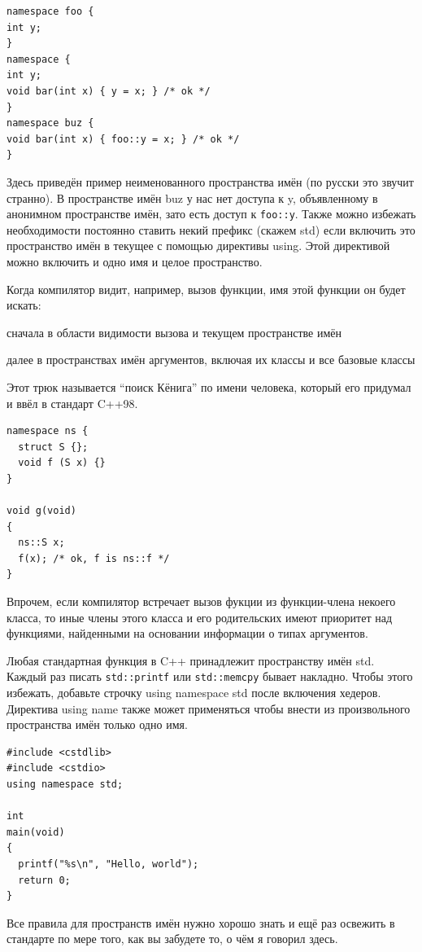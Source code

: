 \documentclass[a4paper,12pt,oneside]{article}
\begin{document}
\begin{lstlisting}
namespace foo {
int y;
}
namespace {
int y;
void bar(int x) { y = x; } /* ok */
}
namespace buz {
void bar(int x) { foo::y = x; } /* ok */
}
\end{lstlisting}

Здесь приведён пример неименованного пространства имён (по русски это звучит странно). В пространстве имён buz у нас нет доступа к y, объявленному в анонимном пространстве имён, зато есть доступ к \lstinline!foo::y!. Также можно избежать необходимости постоянно ставить некий префикс (скажем std) если включить это пространство имён в текущее с помощью директивы using. Этой директивой можно включить и одно имя и целое пространство.

Когда компилятор видит, например, вызов функции, имя этой функции он будет искать:

сначала в области видимости вызова и текущем пространстве имён

далее в пространствах имён аргументов, включая их классы и все базовые классы

Этот трюк называется ``поиск Кёнига'' по имени человека, который его придумал и ввёл в стандарт C++98.

\begin{lstlisting}
namespace ns {
  struct S {};
  void f (S x) {}
}

void g(void)
{
  ns::S x;
  f(x); /* ok, f is ns::f */
}
\end{lstlisting}

Впрочем, если компилятор встречает вызов фукции из функции-члена некоего класса, то иные члены этого класса и его родительских имеют приоритет над функциями, найденными на основании информации о типах аргументов.

Любая стандартная функция в C++ принадлежит пространству имён std. Каждый раз писать \lstinline!std::printf! или \lstinline!std::memcpy! бывает накладно. Чтобы этого избежать, добавьте строчку using namespace std после включения хедеров. Директива using name также может применяться чтобы внести из произвольного пространства имён только одно имя.

\begin{lstlisting}
#include <cstdlib>
#include <cstdio>
using namespace std;

int 
main(void)
{
  printf("%s\n", "Hello, world");
  return 0;
}
\end{lstlisting}

Все правила для пространств имён нужно хорошо знать и ещё раз освежить в стандарте по мере того, как вы забудете то, о чём я говорил здесь.
\end{document}
